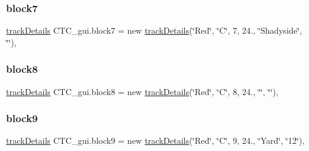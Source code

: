\mbox{\label{classCTC__gui_a5b98f4aed52daa3a53ebb68a3930756e}} 
\subsubsection{\texorpdfstring{block7}{block7}}
{\footnotesize\ttfamily \hyperlink{classtrackDetails}{track\+Details} C\+T\+C\+\_\+gui.\+block7 = new \hyperlink{classtrackDetails}{track\+Details}(\char`\"{}Red\char`\"{}, \char`\"{}C\char`\"{}, 7, 24., \char`\"{}Shadyside\char`\"{}, \char`\"{}\char`\"{})\hspace{0.3cm}{\ttfamily [static]}, {\ttfamily [package]}}

\mbox{\label{classCTC__gui_a2fbaa1b3920a22fb3180b607abb15d78}} 
\subsubsection{\texorpdfstring{block8}{block8}}
{\footnotesize\ttfamily \hyperlink{classtrackDetails}{track\+Details} C\+T\+C\+\_\+gui.\+block8 = new \hyperlink{classtrackDetails}{track\+Details}(\char`\"{}Red\char`\"{}, \char`\"{}C\char`\"{}, 8, 24., \char`\"{}\char`\"{}, \char`\"{}\char`\"{})\hspace{0.3cm}{\ttfamily [static]}, {\ttfamily [package]}}

\mbox{\label{classCTC__gui_ad71b4889f6be57834e8dffb5a0e5ed37}} 
\subsubsection{\texorpdfstring{block9}{block9}}
{\footnotesize\ttfamily \hyperlink{classtrackDetails}{track\+Details} C\+T\+C\+\_\+gui.\+block9 = new \hyperlink{classtrackDetails}{track\+Details}(\char`\"{}Red\char`\"{}, \char`\"{}C\char`\"{}, 9, 24., \char`\"{}Yard\char`\"{}, \char`\"{}12\char`\"{})\hspace{0.3cm}{\ttfamily [static]}, {\ttfamily [package]}}

\mbox{\label{classCTC__gui_a64af0234646b1a791a6dd3b5e4a77950}} 

